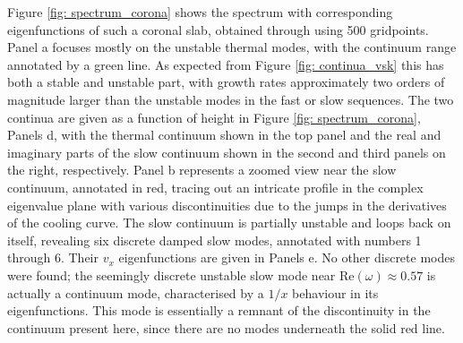 Figure \ref{fig: spectrum_corona} shows the spectrum with corresponding eigenfunctions of such a coronal slab, obtained through {\legolas} using 500 gridpoints. Panel a focuses mostly on the unstable thermal modes, with the continuum range annotated by a green line. As expected from Figure \ref{fig: continua_vsk} this has both a stable and unstable part, with growth rates approximately two orders of magnitude larger than the unstable modes in the fast or slow sequences. The two continua are given as a function of height in Figure \ref{fig: spectrum_corona}, Panels d, with the thermal continuum shown in the top panel and the real and imaginary parts of the slow continuum shown in the second and third panels on the right, respectively. Panel b represents a zoomed view near the slow continuum, annotated in red, tracing out an intricate profile in the complex eigenvalue plane with various discontinuities due to the jumps in the derivatives of the cooling curve. The slow continuum is partially unstable and loops back on itself, revealing six discrete damped slow modes, annotated with numbers 1 through 6. Their $v_x$ eigenfunctions are given in Panels e. No other discrete modes were found; the seemingly discrete unstable slow mode near Re$(\omega) \approx 0.57$ is actually a continuum mode, characterised by a $1/x$ behaviour in its eigenfunctions. This mode is essentially a remnant of the discontinuity in the continuum present here, since there are no modes underneath the solid red line.
